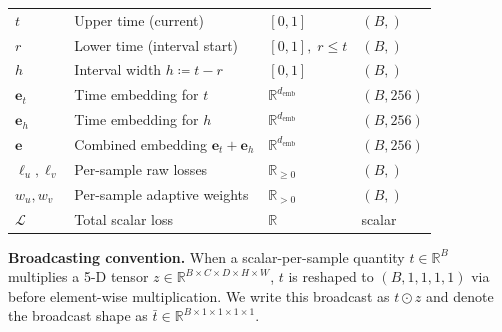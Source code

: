 \begin{table}[ht]
\begin{tabular}{llll}
\midrule
$t$ & Upper time (current) & $[0,1]$ & $(B,)$ \\
$r$ & Lower time (interval start) & $[0,1],\; r \le t$ & $(B,)$ \\
$h$ & Interval width $h \coloneqq t - r$ & $[0,1]$ & $(B,)$ \\
\midrule
$\mathbf{e}_t$ & Time embedding for $t$ & $\mathbb{R}^{d_\mathrm{emb}}$ & $(B, 256)$ \\
$\mathbf{e}_h$ & Time embedding for $h$ & $\mathbb{R}^{d_\mathrm{emb}}$ & $(B, 256)$ \\
$\mathbf{e}$ & Combined embedding $\mathbf{e}_t + \mathbf{e}_h$ & $\mathbb{R}^{d_\mathrm{emb}}$ & $(B, 256)$ \\
\midrule
$\ell_u, \ell_v$ & Per-sample raw losses & $\mathbb{R}_{\ge 0}$ & $(B,)$ \\
$w_u, w_v$ & Per-sample adaptive weights & $\mathbb{R}_{> 0}$ & $(B,)$ \\
$\mathcal{L}$ & Total scalar loss & $\mathbb{R}$ & scalar \\
\bottomrule
\end{tabular}
\end{table}

\textbf{Broadcasting convention.}  When a scalar-per-sample quantity $t \in
\mathbb{R}^B$ multiplies a 5-D tensor $z \in \mathbb{R}^{B \times C \times D
\times H \times W}$, $t$ is reshaped to $(B, 1, 1, 1, 1)$ via
 before element-wise multiplication.  We write
this broadcast as $t \odot z$ and denote the broadcast shape as
$\bar{t} \in \mathbb{R}^{B \times 1 \times 1 \times 1 \times 1}$.